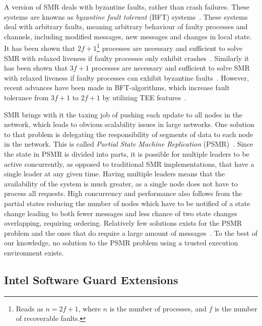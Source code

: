 \documentclass{article}
\begin{document}
		A version of SMR deals with byzantine faults, rather than crash failures.
		These systems are knowns as \textit{byzantine fault tolerant} (BFT) systems~\cite{castro_practical_1999,correia_byzantine_2011,veronese_efficient_2013,liu_scalable_2016}.
		These systems deal with arbitrary faults, meaning arbitrary behaviour of faulty processes and channels, including modified messages, new messages and changes in local state.
		It has been shown that $2f+1$\footnote{Reads as $n=2f+1$, where $n$ is the number of processes, and $f$ is the number of recoverable faults.} processes are necessary and sufficient to solve SMR with relaxed liveness if faulty processes only exhibit crashes~\cite{bracha_asynchronous_1985}.
		Similarly it has been shown that $3f+1$ processes are necessary and sufficient to solve SMR with relaxed liveness if faulty processes can exhibit byzantine faults~\cite{bracha_asynchronous_1985,pease_reaching_1980}.
		However, recent advances have been made in BFT-algorithms, which increase fault tolerance from $3f+1$ to $2f+1$ by utilizing TEE features~\cite{liu_scalable_2016,kapitza_cheapbft_2012,veronese_efficient_2013}.

		SMR brings with it the taxing job of pushing each update to all nodes in the network, which leads to obvious scalability issues in large networks.
		One solution to that problem is delegating the responsibility of segments of data to each node in the network.
		This is called \textit{Partial State Machine Replication} (PSMR)~\cite{sousa_partial_2001}.
		Since the state in PSMR is divided into parts, it is possible for multiple leaders to be active concurrently, as opposed to traditional SMR implementations, that have a single leader at any given time.
		Having multiple leaders means that the availability of the system is much greater, as a single node does not have to process all requests.
		High concurrency and performance also follows from the partial states reducing the number of nodes which have to be notified of a state change leading to both fewer messages and less chance of two state changes overlapping, requiring ordering.
		Relatively few solutions exists for the PSMR problem and the ones that do require a large amount of messages~\cite{sousa_partial_2001}.
		To the best of our knowledge, no solution to the PSMR problem using a trusted execution environment exists.

		\subsection{Intel Software Guard Extensions}
		\label{subsec:intel-sgx}
\end{document}
